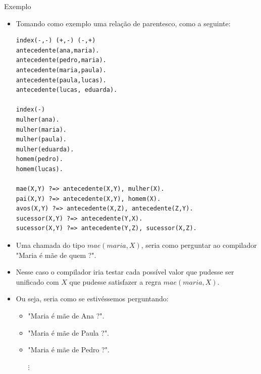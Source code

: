 
\begin{frame}[fragile]{Exemplo}
    
    \begin{itemize}
        
        \item Tomando como exemplo uma relação de parentesco, como a seguinte:
        \begin{lstlisting}[frame=single]
index(-,-) (+,-) (-,+)
antecedente(ana,maria).
antecedente(pedro,maria).
antecedente(maria,paula).
antecedente(paula,lucas).
antecedente(lucas, eduarda).

index(-)
mulher(ana).
mulher(maria).
mulher(paula).
mulher(eduarda).
homem(pedro).
homem(lucas).

mae(X,Y) ?=> antecedente(X,Y), mulher(X).
pai(X,Y) ?=> antecedente(X,Y), homem(X).
avos(X,Y) ?=> antecedente(X,Z), antecedente(Z,Y).
sucessor(X,Y) ?=> antecedente(Y,X).
sucessor(X,Y) ?=> antecedente(Y,Z), sucessor(X,Z).
        \end{lstlisting}
    \end{itemize}
    
\end{frame}




\begin{frame}[allowframebreaks]{}
    
    \begin{itemize}
        \item Uma chamada do tipo $mae(maria, X)$, seria como perguntar ao compilador
        "Maria é mãe de quem ?".
        
        \item Nesse caso o compilador iria testar cada possível valor que pudesse ser 
        unificado com $X$ que pudesse satisfazer a regra $mae(maria,X)$.
        
        \item Ou seja, seria como se estivéssemos perguntando:
        
        \begin{itemize}
            \item "Maria é mãe de Ana ?".
            
            \item "Maria é mãe de Paula ?".
            
            \item "Maria é mãe de Pedro ?".
            
            $\vdots$
        \end{itemize}
        
    \end{itemize}
    
\end{frame}


